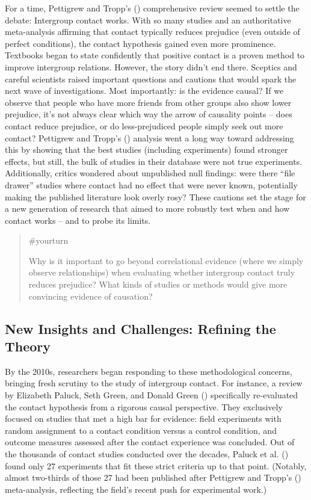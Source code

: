 \documentclass[
  letterpaper,
]{book}
\begin{document}
For a time, Pettigrew and Tropp's
() comprehensive review seemed
to settle the debate: Intergroup contact works. With so many studies and
an authoritative meta-analysis affirming that contact typically reduces
prejudice (even outside of perfect conditions), the contact hypothesis
gained even more prominence. Textbooks began to state confidently that
positive contact is a proven method to improve intergroup relations.
However, the story didn't end there. Sceptics and careful scientists
raised important questions and cautions that would spark the next wave
of investigations. Most importantly: is the evidence causal? If we
observe that people who have more friends from other groups also show
lower prejudice, it's not always clear which way the arrow of causality
points -- does contact reduce prejudice, or do less-prejudiced people
simply seek out more contact? Pettigrew and Tropp's
() analysis went a long way
toward addressing this by showing that the best studies (including
experiments) found stronger effects, but still, the bulk of studies in
their database were not true experiments. Additionally, critics wondered
about unpublished null findings: were there ``file drawer'' studies
where contact had no effect that were never known, potentially making
the published literature look overly rosy? These cautions set the stage
for a new generation of research that aimed to more robustly test when
and how contact works -- and to probe its limits.

\begin{quote}
{\#yourturn}

Why is it important to go beyond correlational evidence (where we simply
observe relationships) when evaluating whether intergroup contact truly
reduces prejudice? What kinds of studies or methods would give more
convincing evidence of causation?
\end{quote}

\subsection{New Insights and Challenges: Refining the
Theory}\label{new-insights-and-challenges-refining-the-theory}

By the 2010s, researchers began responding to these methodological
concerns, bringing fresh scrutiny to the study of intergroup contact.
For instance, a review by Elizabeth Paluck, Seth Green, and Donald Green
() specifically re-evaluated the
contact hypothesis from a rigorous causal perspective. They exclusively
focused on studies that met a high bar for evidence: field experiments
with random assignment to a contact condition versus a control
condition, and outcome measures assessed after the contact experience
was concluded. Out of the thousands of contact studies conducted over
the decades, Paluck et al. ()
found only 27 experiments that fit these strict criteria up to that
point. (Notably, almost two-thirds of those 27 had been published after
Pettigrew and Tropp's ()
meta-analysis, reflecting the field's recent push for experimental
work.)
\end{document}
